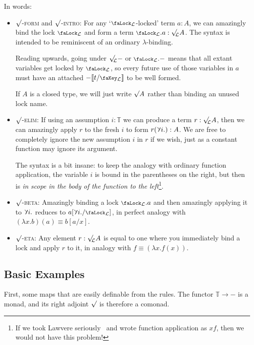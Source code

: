 \documentclass[10pt]{article}
\theoremstyle{definition}
\let\oldequiv\equiv%
\renewcommand{\equiv}{\simeq}
\newcommand{\defeq}{\oldequiv}
\newcommand{\rulen}[1]{\textsc{#1}}
\newcommand{\lock}{\mathchoice {\scalebox{0.8}{\text{\faLock}}}
  {\scalebox{0.8}{\text{\faLock}}} {\scalebox{0.5}{\text{\faLock}}}
  {\scalebox{0.4}{\text{\faLock}}} }
\newcommand{\key}{\mathchoice
  {\scalebox{0.8}{\text{\faKey}}} {\scalebox{0.8}{\text{\faKey}}}
  {\scalebox{0.5}{\text{\faKey}}} {\scalebox{0.4}{\text{\faKey}}} }
\newcommand{\rbindsym}{\raisebox{-0.5pt}{\scalerel*{\reflectbox{\rotatebox[origin=c]{185}{$\lambda$}}}{\lambda}}}
\newcommand{\rbind}[1]{\rbindsym{} #1.}
\newcommand{\Tiny}{\mathbb{T}}
\newcommand{\lockn}[1]{\mathcal{#1}}
\newcommand{\ctxlocke}[1]{\lock_{#1}}
\newcommand{\ctxlock}[1]{\ctxlocke{\lockn{#1}}}
\newcommand{\stubra}[1]{\llbracket #1 \rrbracket}
\newcommand{\admbra}[1]{[ #1 ]}
\newcommand{\substucke}[2]{\stubra{#1/\key_{#2}}}
\newcommand{\substuck}[2]{\substucke{#1}{\lockn{#2}}}
\newcommand{\sublock}[2]{\admbra{\rbindsym{} #2. /\lock_{\lockn{#1}} }}
\newcommand{\rformsym}{\surd}
\newcommand{\rforme}[2]{\ThisStyle{\raisebox{0.07em}{$\SavedStyle \rformsym_{\hspace{-0.25em}#1}$}} #2}
\newcommand{\rform}[2]{\rforme{\lockn{#1}}{#2}}
\newcommand{\rformu}[1]{\ThisStyle{\raisebox{0.07em}{$\SavedStyle \rformsym$}} #1}
\newcommand{\rintroe}[2]{\lock_{#1}. #2}
\newcommand{\rintro}[2]{\rintroe{\lockn{#1}}{#2}}
\begin{document}
In words:
\begin{itemize}
\item \rulen{$\rformsym$-form} and \rulen{$\rformsym$-intro}: For any
  `$\ctxlock{L}$-locked' term $a : A$, we can amazingly bind the lock
  $\ctxlock{L}$ and form a term $\rintro{L} a : \rform{L} A$. The syntax
  is intended to be reminiscent of an ordinary $\lambda$-binding.

  Reading upwards, going under $\rform{L} - $ or $\rintro{L} -$ means
  that all extant variables get locked by $\ctxlock{L}$, so every
  future use of those variables in $a$ must have an attached
  $-\substuck{t}{L}$ to be well formed.

  If $A$ is a closed type, we will just write $\rformu A$ rather than
  binding an unused lock name.
  
\item \rulen{$\rformsym$-elim}: If using an assumption $i : \Tiny$ we can
  produce a term $r : \rform{L} A$, then we can amazingly apply $r$ to
  the fresh $i$ to form $r(\rbind{i}) : A$. We are free to completely
  ignore the new assumption $i$ in $r$ if we wish, just as a constant
  function may ignore its argument.

  The syntax is a bit insane: to keep the analogy with ordinary
  function application, the variable $i$ is bound in the parentheses
  on the right, but then is \emph{in scope in the body of the function
    to the left}\footnote{If we took Lawvere
  seriously~\cite{lawvere:adjointness-foundations} and wrote function
  application as $xf$, then we would not have this problem!}.
  
\item \rulen{$\rformsym$-beta}: Amazingly binding a lock $\rintro{L} a$
  and then amazingly applying it to $\rbind{i}$ reduces to
  $a\sublock{L}{i}$, in perfect analogy with
  $(\lambda x. b)(a) \defeq b[a/x]$.
  
\item \rulen{$\rformsym$-eta}: Any element $r : \rform{L} A$ is equal to
  one where you immediately bind a lock and apply $r$ to it, in
  analogy with $f \defeq (\lambda x. f(x))$.
\end{itemize}

\subsection{Basic Examples}

First, some maps that are easily definable from the rules. The functor
$\Tiny \to -$ is a monad, and its right adjoint $\rformu{}$
is therefore a comonad.
\end{document}
